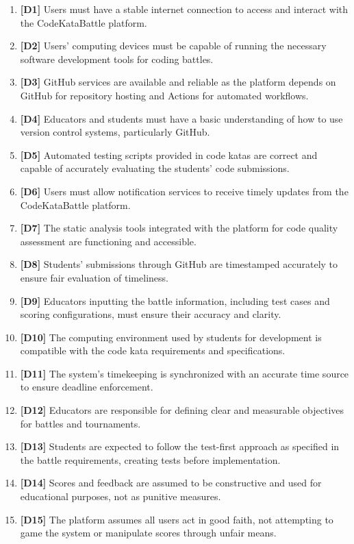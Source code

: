 \begin{enumerate}
    \item \textbf{[D1]} Users must have a stable internet connection to access and interact with the CodeKataBattle platform.
    \item \textbf{[D2]} Users' computing devices must be capable of running the necessary software development tools for coding battles.
    \item \textbf{[D3]} GitHub services are available and reliable as the platform depends on GitHub for repository hosting and Actions for automated workflows.
    \item \textbf{[D4]} Educators and students must have a basic understanding of how to use version control systems, particularly GitHub.
    \item \textbf{[D5]} Automated testing scripts provided in code katas are correct and capable of accurately evaluating the students' code submissions.
    \item \textbf{[D6]} Users must allow notification services to receive timely updates from the CodeKataBattle platform.
    \item \textbf{[D7]} The static analysis tools integrated with the platform for code quality assessment are functioning and accessible.
    \item \textbf{[D8]} Students' submissions through GitHub are timestamped accurately to ensure fair evaluation of timeliness.
    \item \textbf{[D9]} Educators inputting the battle information, including test cases and scoring configurations, must ensure their accuracy and clarity.
    \item \textbf{[D10]} The computing environment used by students for development is compatible with the code kata requirements and specifications.
    \item \textbf{[D11]} The system's timekeeping is synchronized with an accurate time source to ensure deadline enforcement.
    \item \textbf{[D12]} Educators are responsible for defining clear and measurable objectives for battles and tournaments.
    \item \textbf{[D13]} Students are expected to follow the test-first approach as specified in the battle requirements, creating tests before implementation.
    \item \textbf{[D14]} Scores and feedback are assumed to be constructive and used for educational purposes, not as punitive measures.
    \item \textbf{[D15]} The platform assumes all users act in good faith, not attempting to game the system or manipulate scores through unfair means.
\end{enumerate}


\newpage